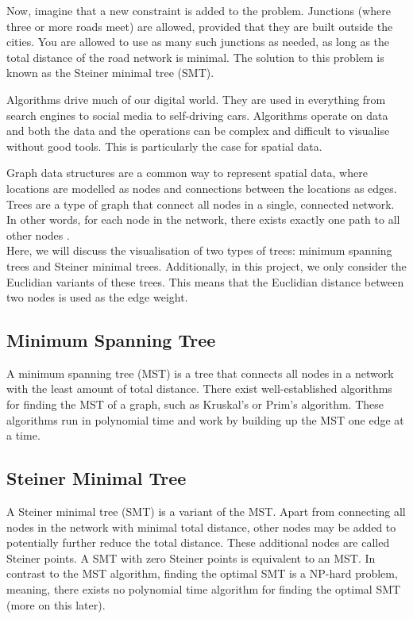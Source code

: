 \documentclass{l4proj}
\begin{document}
Now, imagine that a new constraint is added to the problem. Junctions (where three or more roads meet) are allowed, provided that they are built outside the cities. You are allowed to use as many such junctions as needed, as long as the total distance of the road network is minimal. The solution to this problem is known as the Steiner minimal tree (SMT).

Algorithms drive much of our digital world. They are used in everything from search engines to social media to self-driving cars. Algorithms operate on data and both the data and the operations can be complex and difficult to visualise without good tools. This is particularly the case for spatial data.

Graph data structures are a common way to represent spatial data, where locations are modelled as nodes and connections between the locations as edges. Trees are a type of graph that connect all nodes in a single, connected network. In other words, for each node in the network, there exists exactly one path to all other nodes \citep{tree_graph_theory}.
\\
Here, we will discuss the visualisation of two types of trees: minimum spanning trees and Steiner minimal trees. Additionally, in this project, we only consider the Euclidian variants of these trees. This means that the Euclidian distance between two nodes is used as the edge weight.

\subsection{Minimum Spanning Tree}
A minimum spanning tree (MST) is a tree that connects all nodes in a network with the least amount of total distance.
There exist well-established algorithms for finding the MST of a graph, such as Kruskal's or Prim's algorithm. These algorithms run in polynomial time and work by building up the MST one edge at a time.
\subsection{Steiner Minimal Tree}
A Steiner minimal tree (SMT) is a variant of the MST.
Apart from connecting all nodes in the network with minimal total distance, other nodes may be added to potentially further reduce the total distance. These additional nodes are called Steiner points.
A SMT with zero Steiner points is equivalent to an MST. In contrast to the MST algorithm, finding the optimal SMT is a NP-hard problem, meaning, there exists no polynomial time algorithm for finding the optimal SMT (more on this later).
\end{document}
